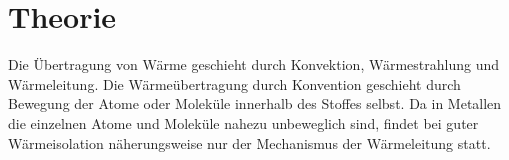 \section{Theorie}
\label{sec:Theorie}
Die Übertragung von Wärme geschieht durch Konvektion, Wärmestrahlung und Wärmeleitung.
Die Wärmeübertragung durch Konvention geschieht durch Bewegung der Atome oder
Moleküle innerhalb des Stoffes selbst. Da in Metallen die einzelnen Atome und
Moleküle nahezu unbeweglich sind, findet bei guter Wärmeisolation näherungsweise
nur der Mechanismus der Wärmeleitung statt.
